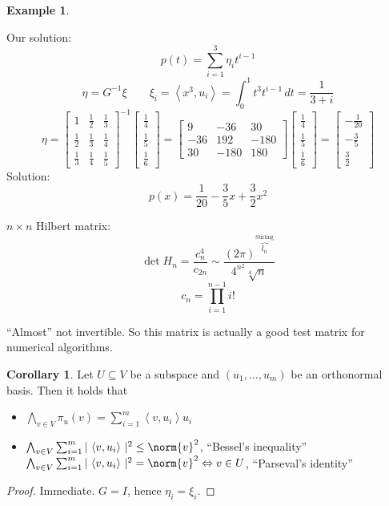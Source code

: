 \documentclass[a4paper,landscape,twocolumn]{article}
\newcommand\abs[1]{|\,#1\,|}
\newcommand\functional[1]{\left\langle{#1}\right\rangle}
\theoremstyle{definition}
\newtheorem{ex}{Example}
\newtheorem{cor}{Corollary}
\DeclarePairedDelimiter\norm\lVert\rVert
\begin{document}
\begin{ex}
\begin{description}
      Our solution:
      \[ p(t) = \sum_{i=1}^3 \eta_i t^{i-1} \]
      \[ \eta = G^{-1} \xi \qquad \xi_i = \functional{x^3, u_i} = \int_0^1 t^3 t^{i-1} \, dt = \frac{1}{3+i} \]
      \[
        \eta = \begin{bmatrix}
          1 & \frac12 & \frac13 \\
          \frac12 & \frac13 & \frac14 \\
          \frac13 & \frac14 & \frac15
        \end{bmatrix}^{-1}
        \begin{bmatrix} \frac14 \\ \frac15 \\ \frac16 \end{bmatrix}
        = \begin{bmatrix}
          9 & -36 & 30 \\
          -36 & 192 & -180 \\
          30 & -180 & 180
        \end{bmatrix}
        \begin{bmatrix} \frac14 \\ \frac15 \\ \frac16 \end{bmatrix}
        = \begin{bmatrix} -\frac1{20} \\ -\frac35 \\ \frac32 \end{bmatrix}
      \]
      Solution:
      \[ p(x) = \frac1{20} - \frac35 x + \frac32 x^2 \]

      $n\times n$ Hilbert matrix:
      \[ \det{H_n} = \frac{c_n^4}{c_{2n}} \sim \frac{(2\pi)^{\overbrace{l_n}^{\text{Stirling}}}}{4^{n^2} \sqrt[4]{n}} \]
      \[ c_n = \prod_{i=1}^{n-1} i! \]

      \enquote{Almost} not invertible.
      So this matrix is actually a good test matrix for numerical algorithms.
  \end{description}
\end{ex}

\begin{cor}
  \label{korollar-8.56}
  Let $U \subseteq V$ be a subspace and $(u_1, \ldots, u_m)$ be an orthonormal basis.
  Then it holds that
  \begin{itemize}
    \item $\bigwedge_{v \in V} \pi_u(v) = \sum_{i=1}^m \functional{v, u_i} u_i$
    \item
      $\bigwedge_{v \in V} \sum_{i=1}^m \abs{\functional{v, u_i}}^2 \leq \norm{v}^2$,
      \quad \enquote{Bessel's inequality} \\
      $\bigwedge_{v \in V} \sum_{i=1}^m \abs{\functional{v, u_i}}^2 = \norm{v}^2 \Leftrightarrow v \in U$,
      \quad \enquote{Parseval's identity}
  \end{itemize}
\end{cor}
\begin{proof}
  Immediate.
  $G = I$, hence $\eta_i = \xi_i$.
\end{proof}
\end{document}

